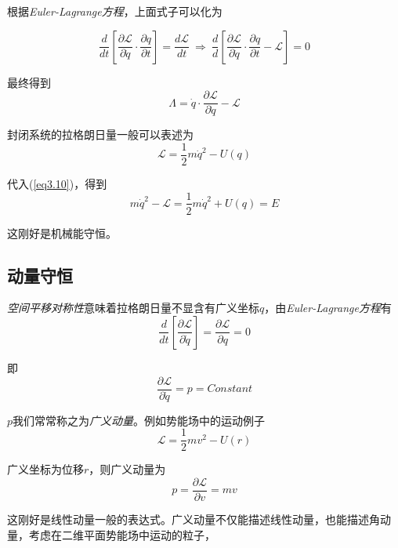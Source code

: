 根据\textsl{Euler-Lagrange方程}，上面式子可以化为

\begin{equation}
    \frac{d}{dt}\left[\frac{\partial \mathcal{L}}{\partial \dot{q}}\cdot \frac{\partial q}{\partial t}\right]=\frac{d\mathcal{L}}{dt}
    \ \Rightarrow\ \frac{d}{d}\left[\frac{\partial \mathcal{L}}{\partial \dot{q}}\cdot \frac{\partial q}{\partial t}-\mathcal{L}\right]=0
\end{equation}

最终得到
\begin{equation}
    \varLambda=\dot{q}\cdot\frac{\partial\mathcal{L}}{\partial\dot{q}}-\mathcal{L}
    \label{eq3.10}
\end{equation}

封闭系统的拉格朗日量一般可以表述为
\begin{equation}
    \mathcal{L}=\frac{1}{2}m\dot{q}^2-U(q)
\end{equation}

代入(\ref{eq3.10})，得到
\begin{equation}
    m\dot{q}^2-\mathcal{L}=\frac{1}{2}m\dot{q}^2+U(q)=E
\end{equation}

这刚好是机械能守恒。


\subsection*{动量守恒}

\textsl{空间平移对称性}意味着拉格朗日量不显含有广义坐标$q$，由\textsl{Euler-Lagrange方程}有
\begin{equation}
    \frac{d}{dt}\left[\frac{\partial \mathcal{L}}{\partial \dot{q}}\right]=\frac{\partial \mathcal{L}}{\partial q}=0
\end{equation}

即
\begin{equation}
    \frac{\partial \mathcal{L}}{\partial \dot{q}}=p=Constant
\end{equation}

$p$我们常常称之为\textsl{广义动量}。例如势能场中的运动例子
\begin{equation}
    \mathcal{L}=\frac{1}{2}mv^2-U(r)
\end{equation}

广义坐标为位移$r$，则广义动量为
\begin{equation}
    p=\frac{\partial \mathcal{L}}{\partial v}=mv
\end{equation}

这刚好是线性动量一般的表达式。广义动量不仅能描述线性动量，也能描述角动量，考虑在二维平面势能场中运动的粒子，

